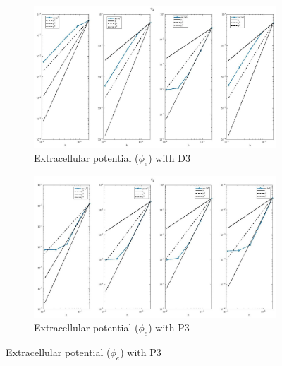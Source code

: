 \documentclass[a4paper,11pt]{article}
\begin{document}
\begin{figure}[H]
\caption{Comparison of the extracellular potential ($\phi_e$)}
\label{phie_3}
\begin{subfigure}{\textwidth}
\begin{center}
\includegraphics[width = \textwidth]{./D3_Phie_1.jpg}
\caption{Extracellular potential ($\phi_e$) with D3}
\end{center}
\end{subfigure}
\begin{subfigure}{\textwidth}
\begin{center}
\includegraphics[width =\textwidth]{./P3_Phie_1.jpg}
\caption{Extracellular potential ($\phi_e$) with P3}
\end{center}
\end{subfigure}
\end{figure}
\newpage
\end{document}
